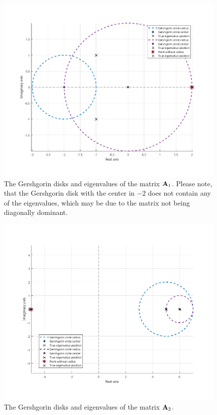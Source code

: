 \begin{figure}[H]
    \centering
    \includegraphics[width=1\textwidth]{problems/Figures/Problem_7/first_matrix.png}
    \caption{The Gershgorin disks and eigenvalues of the matrix $\mathbf{A}_1$.
    Please note, that the Gershgorin disk with the center in $-2$ does not contain any
    of the eigenvalues, which may be due to the matrix not being diagonally dominant.
    }
\end{figure}
\begin{figure}[H]
    \centering
    \includegraphics[width=1\textwidth]{problems/Figures/Problem_7/second_matrix.png}
    \caption{The Gershgorin disks and eigenvalues of the matrix $\mathbf{A}_2$.}
\end{figure}
